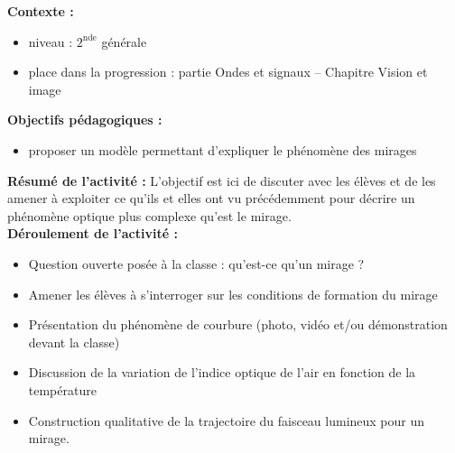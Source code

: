 \documentclass[a4paper,11pt]{article} %
\newenvironment{encart}[1]{%
	\begin{tcolorbox}
		[
		breakable, enhanced jigsaw, %
		arc = 1mm, %
		title = \textbf{#1}, %
		coltitle = white, %
		colbacktitle = blue, %
		colback = white, %
		colframe = blue %
		]
}{		
	\end{tcolorbox}
}
\begin{document}
	\begin{encart}{Activité pédagogique 3 : description qualitative d'un mirage}
		\textbf{Contexte :}
		\begin{itemize}
			\item niveau : $ 2^\text{nde} $ générale
			\item place dans la progression : partie Ondes et signaux -- Chapitre Vision et image  
		\end{itemize}
		\vspace{0.5cm}
		
		\textbf{Objectifs pédagogiques :}
		\begin{itemize}
			\item proposer un modèle permettant d'expliquer le phénomène des mirages
		\end{itemize}
		\vspace{0.5cm}
		
		\textbf{Résumé de l'activité :}
		L'objectif est ici de discuter avec les élèves et de les amener à exploiter ce qu'ils et elles ont vu précédemment pour décrire un phénomène optique plus complexe qu'est le mirage.\\
		
		\textbf{Déroulement de l'activité :}
		\begin{itemize}
			\item Question ouverte posée à la classe : \og qu'est-ce qu'un mirage ?\fg{}
			\item Amener les élèves à s'interroger sur les conditions de formation du mirage
			\item Présentation du phénomène de courbure (photo, vidéo et/ou démonstration devant la classe)
			\item Discussion de la variation de l'indice optique de l'air en fonction de la température
			\item Construction qualitative de la trajectoire du faisceau lumineux pour un mirage.
		\end{itemize}
		
	\end{encart}
	
\end{document}
